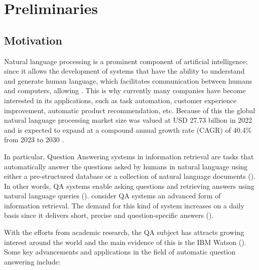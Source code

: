 \chapter{Preliminaries}
\section{Motivation}\label{sec:motivation}

Natural language processing is a prominent component of artificial intelligence; since it allows the development of systems that have the ability to understand and generate human language, which facilitates communication between humans and computers, allowing \cite{torfi2020natural}. This is why currently many companies have become interested in its applications, such as task automation, customer experience improvement, automatic product recommendation, etc. Because of this the global natural language processing market size was valued at USD 27.73 billion in 2022 and is expected to expand at a compound annual growth rate (CAGR) of 40.4\% from 2023 to 2030 \cite{natural_language_processing_market_growth_report_2030_2030}. 

In particular, Question Answering systems in information retrieval are tasks that automatically answer the questions asked by humans in natural language using either a pre-structured database or a collection of natural language documents (\cite{7583963}). In other words, QA systems enable asking questions and retrieving answers using natural language queries (\cite{CAO2010962}). consider QA systems an advanced form of information retrieval. The demand for this kind of system increases on a daily basis since it delivers short, precise and question-specific answers (\cite{7755228}).

With the efforts from academic research, the QA subject has attracts growing interest around the world and the main evidence of this is the IBM Watson (\cite{6177724}). Some key advancements and applications in the field of automatic question answering include:


